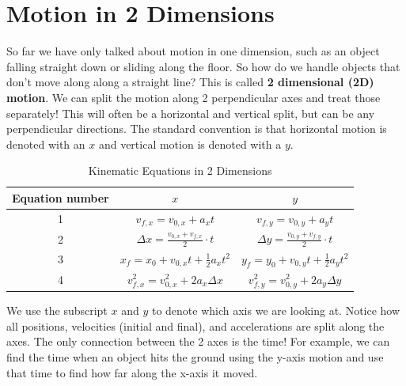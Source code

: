 \documentclass[12pt]{book}
\begin{document}
\section{Motion in 2 Dimensions}
\label{2Dmotion}

So far we have only talked about motion in one dimension, such as an object falling straight down or sliding along the floor. So how do we handle objects that don't move along along a straight line? This is called \textbf{2 dimensional (2D) motion}. We can split the motion along 2 perpendicular axes and treat those separately! This will often be a horizontal and vertical split, but can be any perpendicular directions. The standard convention is that horizontal motion is denoted with an $x$ and vertical motion is denoted with a $y$.

\begin{table}[H]
\large
\centering
\caption{Kinematic Equations in 2 Dimensions}
\label{kmtable}
\begin{tabular}{| c | c | c |}
	\hline
	Equation number & $x$ & $y$ \\
	\hline
	1 & $v_{f,x} = v_{0,x} + a_x t$ & $v_{f,y} = v_{0,y} + a_y t$ \\[5pt] \hline
	2 & $\Delta x = \frac{v_{0,x} + v_{f,x}}{2} \cdot t$ & $\Delta y = \frac{v_{0,y} + v_{f,y}}{2} \cdot t$ \\[5pt] \hline
	3 & $x_f = x_0 + v_{0,x} t + \frac{1}{2} a_x t^2$ & $y_f = y_0 + v_{0,y} t + \frac{1}{2} a_y t^2$ \\[5pt] \hline
	4 & $v_{f,x}^2 = v_{0,x}^2 + 2 a_x \Delta x$ & $v_{f,y}^2 = v_{0,y}^2 + 2 a_y \Delta y$ \\[5pt]
	\hline
\end{tabular}
\end{table}

We use the subscript $x$ and $y$ to denote which axis we are looking at. Notice how all positions, velocities (initial and final), and accelerations are split along the axes. The only connection between the 2 axes is the time! For example, we can find the time when an object hits the ground using the y-axis motion and use that time to find how far along the x-axis it moved.
\end{document}
